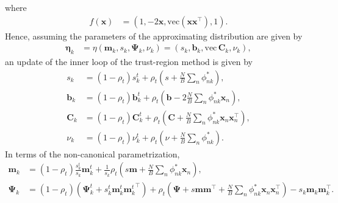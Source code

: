 \documentclass[a4paper]{article}
\begin{document}
			where
			\begin{align}
				f(\mathbf{x}) 
					&= \left(1, -2\mathbf{x}, \text{vec}\left(\mathbf{x}\mathbf{x}^\top\right), 1 \right).
			\end{align}
			Hence, assuming the parameters of the approximating distribution are given by
			\begin{align}
				\bm{\eta}_k 
				&= \eta(\mathbf{m}_k, s_k, \bm{\Psi}_k, \nu_k)
				= \left( s_k, \mathbf{b}_k, \text{vec}\, \mathbf{C}_k, \nu_k \right),
			\end{align}
			an update of the inner loop of the trust-region method is given by
			\begin{align}
				s_k &= (1 - \rho_t) s_k^t + \rho_t \left( s + \frac{N}{B} \sum_n \phi_{nk}^* \right), \\
				\mathbf{b}_k &= (1 - \rho_t) \mathbf{b}_k^t + \rho_t \left( \mathbf{b} - 2 \frac{N}{B} \sum_n \phi_{nk}^* \mathbf{x}_n \right), \\
				\mathbf{C}_k &= (1 - \rho_t) \mathbf{C}_k^t + \rho_t \left(\mathbf{C} + \frac{N}{B} \sum_n \phi_{nk}^* \mathbf{x}_n\mathbf{x}_n^\top \right), \\
				\nu_k &= (1 - \rho_t) \nu_k^t + \rho_t \left(\nu + \frac{N}{B} \sum_n \phi_{nk}^* \right).
			\end{align}
			In terms of the non-canonical parametrization,
			\begin{align}
				\mathbf{m}_k &= (1 - \rho_t) \frac{s_k^t}{s_k} \mathbf{m}_k^t + \frac{1}{s_k} \rho_t \left( s\mathbf{m} + \frac{N}{B} \sum_n \phi_{nk}^* \mathbf{x}_n \right), \\
				\bm{\Psi}_k &= (1 - \rho_t) \left(\bm{\Psi}_k^t +
			s_k^t\mathbf{m}_k^t{\mathbf{m}_k^t}^\top\right) + \rho_t \left(\bm{\Psi} + s\mathbf{m}\mathbf{m}^\top + \frac{N}{B} \sum_n \phi_{nk}^* \mathbf{x}_n\mathbf{x}_n^\top \right) - s_k\mathbf{m}_k\mathbf{m}_k^\top.
			\end{align}
\end{document}
